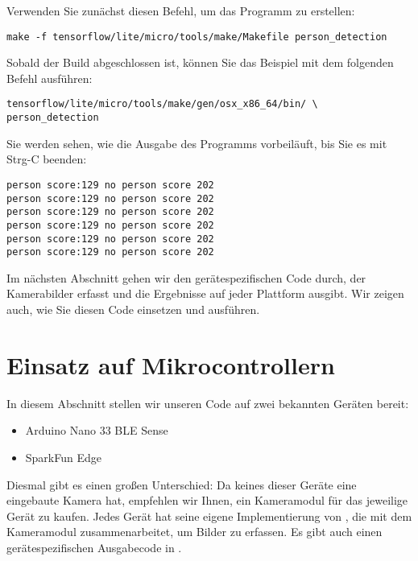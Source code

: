 Verwenden Sie zunächst diesen Befehl, um das Programm zu erstellen:

\begin{code}
    \begin{lstlisting}
make -f tensorflow/lite/micro/tools/make/Makefile person_detection
  \end{lstlisting}
\end{code}

Sobald der Build abgeschlossen ist, können Sie das Beispiel mit dem folgenden Befehl ausführen:

\begin{code}
    \begin{lstlisting}
tensorflow/lite/micro/tools/make/gen/osx_x86_64/bin/ \
person_detection
  \end{lstlisting}
\end{code}

Sie werden sehen, wie die Ausgabe des Programms vorbeiläuft, bis Sie es mit Strg-C beenden:

\begin{code}
    \begin{lstlisting}
person score:129 no person score 202
person score:129 no person score 202
person score:129 no person score 202
person score:129 no person score 202
person score:129 no person score 202
person score:129 no person score 202
  \end{lstlisting}
\end{code}

Im nächsten Abschnitt gehen wir den gerätespezifischen Code durch, der Kamerabilder erfasst und die Ergebnisse auf jeder Plattform ausgibt. Wir zeigen auch, wie Sie diesen Code einsetzen und ausführen.

\section{Einsatz auf Mikrocontrollern}

In diesem Abschnitt stellen wir unseren Code auf zwei bekannten Geräten bereit:

\begin{itemize}
    \item  Arduino Nano 33 BLE Sense
    \item SparkFun Edge
\end{itemize}

Diesmal gibt es einen großen Unterschied: Da keines dieser Geräte eine eingebaute Kamera hat, empfehlen wir Ihnen, ein Kameramodul für das jeweilige Gerät zu kaufen. Jedes Gerät hat seine eigene Implementierung von , die mit dem Kameramodul zusammenarbeitet, um Bilder zu erfassen. Es gibt auch einen gerätespezifischen Ausgabecode in .

